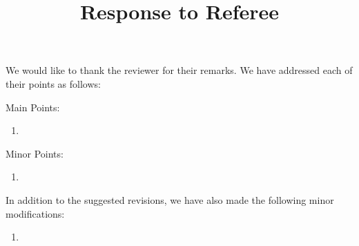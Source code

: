 \documentclass[]{article}
\title{Response to Referee}
\author{}
\begin{document}
\maketitle

We would like to thank the reviewer for their remarks. We have addressed each of their points as follows:

Main Points:
\begin{enumerate}
	\item 
\end{enumerate}

Minor Points:
\begin{enumerate}
	\item 
\end{enumerate}

In addition to the suggested revisions, we have also made the following minor modifications:
\begin{enumerate}
	\item 
\end{enumerate}
\end{document}

